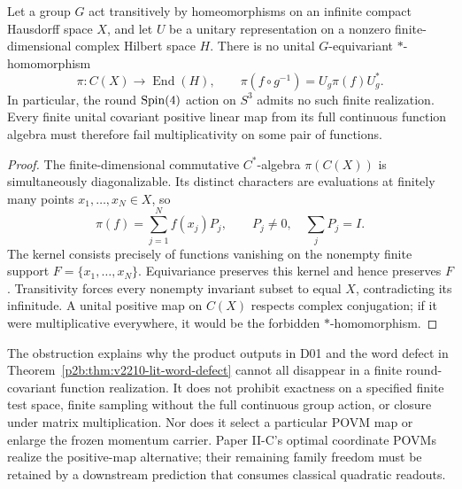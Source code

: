 \documentclass[12pt,a4paper]{article}
\begin{document}
\begin{theorem}
\label{p2b:thm:finite-covariant-classical-algebra-obstruction}
Let a group $G$ act transitively by homeomorphisms on an infinite compact Hausdorff space $X$,
and let $U$ be a unitary representation on a nonzero finite-dimensional
complex Hilbert space $H$.  There is no unital $G$-equivariant
$*$-homomorphism
\[
 \pi:C(X)\longrightarrow\operatorname{End}(H),\qquad
 \pi(f\circ g^{-1})=U_g\pi(f)U_g^*.
\]
In particular, the round $\mathrm{Spin}(4)$ action on $S^3$ admits no such finite
realization.  Every finite unital covariant positive linear map from its
full continuous function algebra must therefore fail multiplicativity on
some pair of functions.
\end{theorem}

\begin{proof}
The finite-dimensional commutative $C^*$-algebra $\pi(C(X))$ is simultaneously
diagonalizable.  Its distinct characters are evaluations at finitely many
points $x_1,\ldots,x_N\in X$, so
\[
 \pi(f)=\sum_{j=1}^N f(x_j)P_j,
 \qquad P_j\ne0,\quad \sum_jP_j=I.
\]
The kernel consists precisely of functions vanishing on the nonempty finite
support $F=\{x_1,\ldots,x_N\}$.  Equivariance preserves this kernel and hence
preserves $F$.  Transitivity forces every nonempty invariant subset to equal
$X$, contradicting its infinitude.  A unital positive map on $C(X)$ respects
complex conjugation; if it were multiplicative everywhere, it would be the
forbidden $*$-homomorphism.
\end{proof}

\begin{remark}
\label{p2b:rem:finite-covariant-defect-scope}
The obstruction explains why the product outputs in D01 and the word defect
in Theorem~\ref{p2b:thm:v2210-lit-word-defect} cannot all disappear in a finite
round-covariant function realization.  It does not prohibit exactness on a
specified finite test space, finite sampling without the full continuous
group action, or closure under matrix multiplication.  Nor does it select a
particular POVM map or enlarge the frozen momentum carrier.  Paper II-C's
optimal coordinate POVMs realize the positive-map alternative; their
remaining family freedom must be retained by a downstream prediction that
consumes classical quadratic readouts.
\end{remark}
\end{document}
